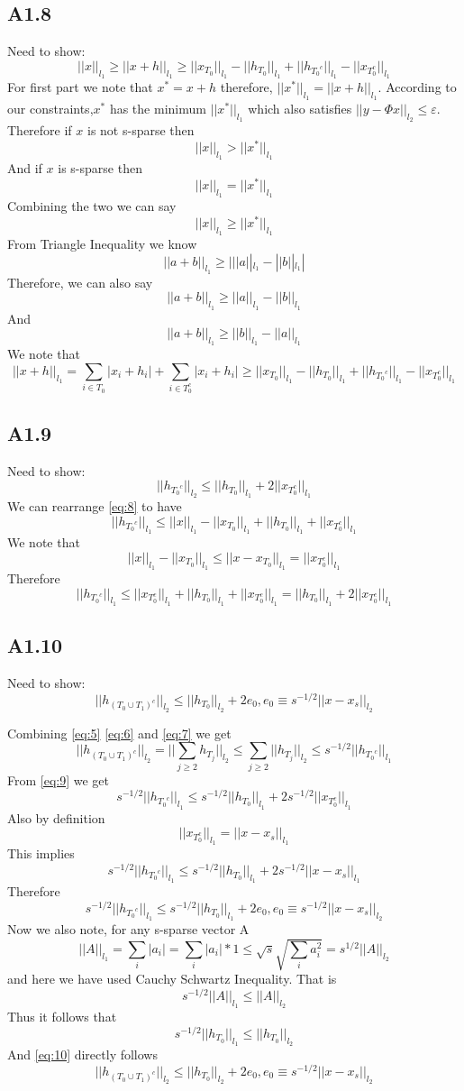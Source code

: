 \documentclass{article}
\newcommand{\lone}[1]{
  ||#1||_{l_1}
}
\newcommand{\ltwo}[1]{
  ||#1||_{l_2}
}
\newcommand{\htj}[1]{
  h_{T_{#1}}
}
\newcommand{\htc}[1]{
  h_{{#1}^c}
}
\newcommand{\hto}[1]{
  h_{#1}
}
\newcommand{\htzoc}{
  h_{(T_0 \cup T_1)^c}
}
\begin{document}
\subsection*{A1.8}
Need to show:
\begin{equation}
  \label{eq:8}
  \lone{x} \ge \lone{x+h} \ge \lone{x_{T_0}} - \lone{\hto{T_0}} + \lone{\htc{T_0}} - \lone{x_{T_0^c}}
\end{equation}
For first part we note that $x^* = x + h$ therefore, $\lone{x^*} = \lone{x + h}$. According to our constraints,$x^*$ has the minimum $\lone{x^*}$ which also satisfies $\ltwo{y - \Phi x} \le \varepsilon$. Therefore if $x$ is not s-sparse then
$$\lone{x} > \lone{x^*}$$
And if $x$ is s-sparse then $$\lone{x} = \lone{x^*}$$
Combining the two we can say
$$\lone{x} \ge \lone{x^*}$$
From Triangle Inequality we know
$$\lone{a+b} \ge |\lone{a} - \lone{b}|$$
Therefore, we can also say
$$\lone{a+b} \ge \lone{a} - \lone{b}$$
And
$$\lone{a+b} \ge \lone{b} - \lone{a}$$
We note that
$$\lone{x+h} = \sum_{i \in T_0}|x_i + h_i| + \sum_{i \in T_0^c}|x_i + h_i| \ge \lone{x_{T_0}} - \lone{\hto{T_0}} + \lone{\htc{T_0}} - \lone{x_{T_0^c}}$$

\subsection*{A1.9}
Need to show:
\begin{equation}
  \label{eq:9}
  \ltwo{\htc{T_0}} \le \lone{\hto{T_0}} + 2\lone{x_{T_0^c}}
\end{equation}
We can rearrange \ref{eq:8} to have
$$\lone{\htc{T_0}} \le \lone{x} - \lone{x_{T_0}} + \lone{\hto{T_0}} + \lone{x_{T_0^c}}$$
We note that
$$\lone{x} - \lone{x_{T_0}} \le \lone{x - x_{T_0}} = \lone{x_{T_0^c}}$$
Therefore
$$\lone{\htc{T_0}} \le \lone{x_{T_0^c}} + \lone{\hto{T_0}} + \lone{x_{T_0^c}} = \lone{\hto{T_0}} + 2\lone{x_{T_0^c}}$$

\subsection*{A1.10}
Need to show:
\begin{equation}
  \label{eq:10}
  \ltwo{\htzoc} \le \ltwo{\hto{T_0}} + 2e_0, e_0 \equiv s^{-1/2}\ltwo{x - x_s}
\end{equation}

Combining \ref{eq:5} \ref{eq:6} and \ref{eq:7} we get
$$\ltwo{\htzoc} = \ltwo{\sum_{j \ge 2}\htj{j}} \le \sum_{j \ge 2} \ltwo{\htj{j}} \le s^{-1/2}\lone{\htc{T_0}}$$
From \ref{eq:9} we get
$$s^{-1/2}\lone{\htc{T_0}} \le s^{-1/2}\lone{\hto{T_0}} + 2s^{-1/2}\lone{x_{T_0^c}}$$
Also by definition
$$\lone{x_{T_0^c}} = \lone{x - x_s}$$
This implies
$$s^{-1/2}\lone{\htc{T_0}} \le s^{-1/2}\lone{\hto{T_0}} + 2s^{-1/2}\lone{x - x_s}$$
Therefore
$$s^{-1/2}\lone{\htc{T_0}} \le s^{-1/2}\lone{\hto{T_0}} + 2e_0, e_0 \equiv s^{-1/2}\ltwo{x - x_s}$$
Now we also note, for any s-sparse vector A
$$\lone{A} = \sum_i|a_i| = \sum_i |a_i|*1 \le \sqrt{s}\sqrt{\sum_i a_i^2} = s^{1/2}\ltwo{A}$$
and here we have used Cauchy Schwartz Inequality.
That is
$$s^{-1/2}\lone{A} \le \ltwo{A}$$
Thus it follows that 
$$s^{-1/2}\lone{\hto{T_0}} \le \ltwo{\hto{T_0}}$$
And \ref{eq:10} directly follows
$$\ltwo{\htzoc} \le \ltwo{\hto{T_0}} + 2e_0, e_0 \equiv s^{-1/2}\ltwo{x - x_s}$$
\end{document}
